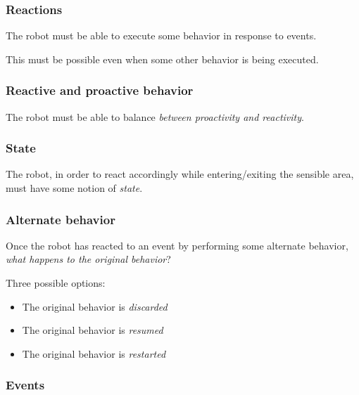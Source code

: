 \documentclass[11pt]{article}
\begin{document}
  
 


\subsubsection{Reactions}

The robot must be able to execute some behavior in response to events.

  This must be possible even when some other behavior is being executed.

\subsubsection{Reactive and proactive behavior}

The robot must be able to balance \emph{between proactivity and reactivity}.


\subsubsection{State}

The robot, in order to react accordingly while entering/exiting the sensible
area, must have some notion of \emph{state}.

\subsubsection{Alternate behavior}

Once the robot has reacted to an event by performing some alternate behavior, 
  \emph{what happens to the original behavior}?
  
Three possible options:

\begin{itemize}
  \item The original behavior is \emph{discarded}
  \item The original behavior is \emph{resumed}
  \item The original behavior is \emph{restarted}
\end{itemize}

\subsubsection{Events}
\end{document}
